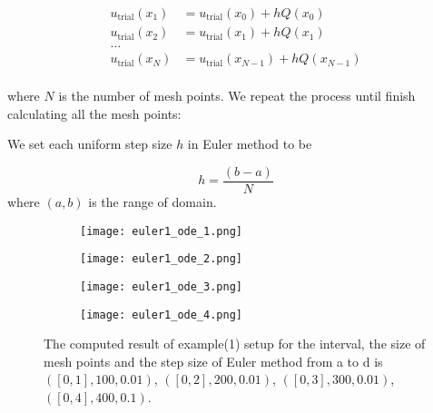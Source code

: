 \documentclass{article}
\begin{document}
    
    \medspace \noindent
   	\begin{equation}
   \begin{aligned}
   u_{\text{trial}}(x_{1}) &= u_{\text{trial}}(x_{0}) +hQ(x_0) \\
   u_{\text{trial}}(x_{2}) &= u_{\text{trial}}(x_{1}) +hQ(x_1)\\
   \dots \\
   u_{\text{trial}}(x_{N}) &= u_{\text{trial}}(x_{N-1}) +hQ(x_{N-1}) \\
   \end{aligned}
   \end{equation}
  
    \medspace \noindent
     where $N$ is the number of mesh points.  We repeat the process until finish calculating all the mesh points: 
    
     \medspace \noindent
     We set each uniform step size $h$  in Euler method to be
    
    \begin{equation}
      h = \frac{(b-a)}{N}
    \end{equation}
    \medspace \noindent
    where $(a,b)$ is the range of domain. 
    
    \begin{figure}[b]
    	\begin{subfigure}{.85\textwidth}
    		\centering
    		\texttt{[image: euler1\_ode\_1.png]}
    	
    	\end{subfigure}
    	\begin{subfigure}{.85\textwidth}
    	\centering
    	\texttt{[image: euler1\_ode\_2.png]}
    
    	\end{subfigure}
		\begin{subfigure}{.85\textwidth}
		\centering
		\texttt{[image: euler1\_ode\_3.png]}
	
		\end{subfigure}
		\begin{subfigure}{.85\textwidth}
			\centering
			\texttt{[image: euler1\_ode\_4.png]}
			
		\end{subfigure}
	\caption{The computed result of example(1) setup for  the interval, the size of mesh points and the step size of Euler method from a to d is $([0,1],100,0.01)$, $([0,2],200,0.01)$, $([0,3],300,0.01)$, $([0,4],400,0.1)$. } 
	\label{fig: euler1_ode}
    \end{figure}
\end{document}
